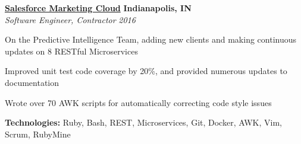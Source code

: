 %
    \headerrow
        {\textbf{\href{https://www.marketingcloud.com/}{Salesforce Marketing Cloud}}}
        {\textbf{Indianapolis, IN}}
    \\
    \headerrow
        {\emph{Software Engineer, Contractor}}
        {\emph{2016}}
    \begin{itemize*}
        \item On the Predictive Intelligence Team, adding new clients and making continuous updates on 8 RESTful Microservices
        \item Improved unit test code coverage by 20\%, and provided numerous updates to documentation
        \item Wrote over 70 AWK scripts for automatically correcting code style issues
    \end{itemize*}

    \hspace{1.0em}
    \textbf{Technologies:} Ruby, Bash, REST, Microservices, Git, Docker, AWK, Vim, Scrum, RubyMine
